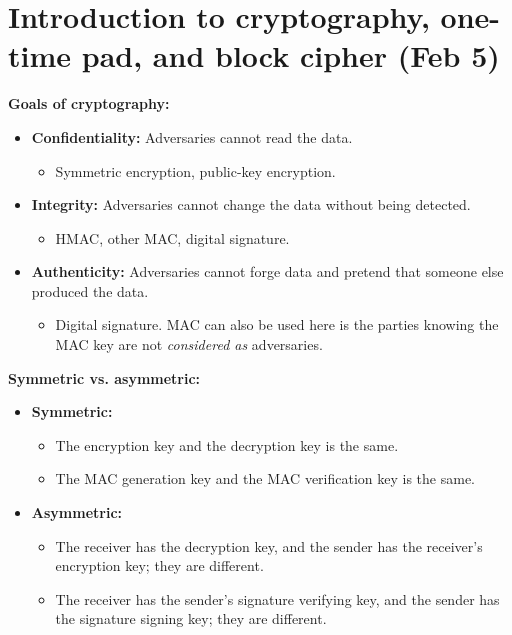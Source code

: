 \documentclass{article}
\newcommand{\parhead}[1]{\noindent \textbf{#1}}
\begin{document}
\newpage
\section{Introduction to cryptography, one-time pad, and block cipher (Feb 5)}
\parhead{Goals of cryptography:}
\begin{itemize}
    \item {\bf Confidentiality:} Adversaries cannot read the data.
    \begin{itemize}
        \item Symmetric encryption, public-key encryption.
    \end{itemize}
    
    \item {\bf Integrity:} Adversaries cannot change the data without being detected.
    \begin{itemize}
        \item HMAC, other MAC, digital signature.
    \end{itemize}
    
    \item {\bf Authenticity:} Adversaries cannot forge data and pretend that someone else produced the data.
    \begin{itemize}
        \item Digital signature. MAC can also be used here is the parties knowing the MAC key are not \emph{considered as} adversaries.
    \end{itemize}
\end{itemize}

\parhead{Symmetric vs. asymmetric:}
\begin{itemize}
    \item {\bf Symmetric:} 
    \begin{itemize}
        \item The encryption key and the decryption key is the same.
        \item The MAC generation key and the MAC verification key is the same.
    \end{itemize}
    
    \item {\bf Asymmetric:}
    \begin{itemize}
        \item The receiver has the decryption key, and the sender has the receiver's encryption key; they are different.
        
        \item The receiver has the sender's signature verifying key, and the sender has the signature signing key; they are different.
    \end{itemize}
\end{itemize}
\end{document}
